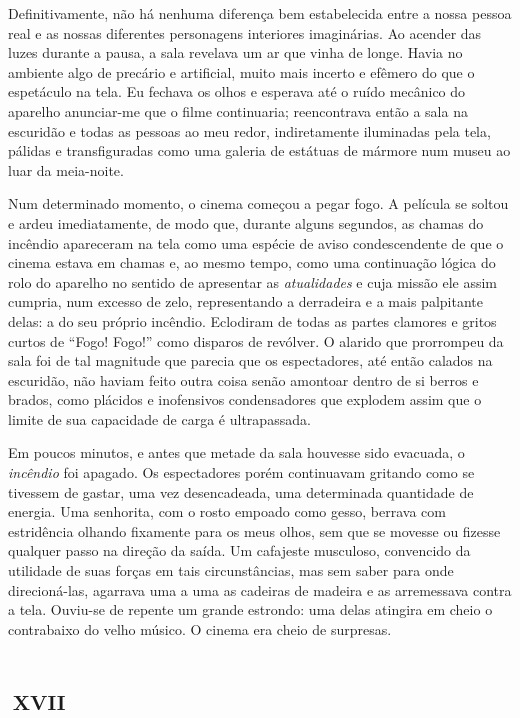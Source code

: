 Definitivamente, não há nenhuma diferença bem estabelecida entre a nossa pessoa real e as nossas diferentes personagens interiores imaginárias. Ao acender das luzes durante a pausa, a sala revelava um ar que vinha de longe. Havia no ambiente algo de precário e artificial, muito mais incerto e efêmero do que o espetáculo na tela. Eu fechava os olhos e esperava até o ruído mecânico do aparelho anunciar-me que o filme continuaria; reencontrava então a sala na escuridão e todas as pessoas ao meu redor, indiretamente iluminadas pela tela, pálidas e transfiguradas como uma galeria de estátuas de mármore num museu ao luar da meia-noite.

Num determinado momento, o cinema começou a pegar fogo. A película se soltou e ardeu imediatamente, de modo que, durante alguns segundos, as chamas do incêndio apareceram na tela como uma espécie de aviso condescendente de que o cinema estava em chamas e, ao mesmo tempo, como uma continuação lógica do rolo do aparelho no sentido de apresentar as \textit{atualidades} e cuja missão ele assim cumpria, num excesso de zelo, representando a derradeira e a mais palpitante delas: a do seu próprio incêndio. Eclodiram de todas as partes clamores e gritos curtos de ``Fogo! Fogo!'' como disparos de revólver. O alarido que prorrompeu da sala foi de tal magnitude que parecia que os espectadores, até então calados na escuridão, não haviam feito outra coisa senão amontoar dentro de si berros e brados, como plácidos e inofensivos condensadores que explodem assim que o limite de sua capacidade de carga é ultrapassada.

Em poucos minutos, e antes que metade da sala houvesse sido evacuada, o \textit{incêndio} foi apagado. Os espectadores porém continuavam gritando como se tivessem de gastar, uma vez desencadeada, uma determinada quantidade de energia. Uma senhorita, com o rosto empoado como gesso, berrava com estridência olhando fixamente para os meus olhos, sem que se movesse ou fizesse qualquer passo na direção da saída. Um cafajeste musculoso, convencido da utilidade de suas forças em tais circunstâncias, mas sem saber para onde direcioná-las, agarrava uma a uma as cadeiras de madeira e as arremessava contra a tela. Ouviu-se de repente um grande estrondo: uma delas atingira em cheio o contrabaixo do velho músico. O cinema era cheio de surpresas.


\chapter*{\small{}\,\Large\centering\textsc{xvii}\,\small{}}

